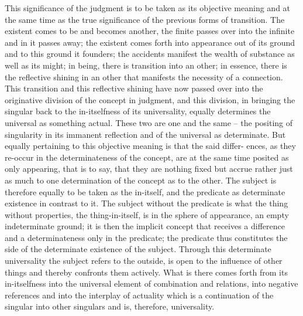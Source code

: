 This significance of the judgment is to be taken as its objective meaning
and at the same time as the true significance of the previous forms of
transition. The existent comes to be and becomes another, the finite passes
over into the infinite and in it passes away; the existent comes forth into
appearance out of its ground and to this ground it founders; the accidents
manifest the wealth of substance as well as its might; in being, there is
transition into an other; in essence, there is the reflective shining in an
other that manifests the necessity of a connection. This transition and this
reflective shining have now passed over into the originative division of the
concept in judgment, and this division, in bringing the singular back to the
in-itselfness of its universality, equally determines the universal as something
actual. These two are one and the same – the positing of singularity in its
immanent reflection and of the universal as determinate.
But equally pertaining to this objective meaning is that the said differ-
ences, as they re-occur in the determinateness of the concept, are at the
same time posited as only appearing, that is to say, that they are nothing
fixed but accrue rather just as much to one determination of the concept as
to the other. The subject is therefore equally to be taken as the in-itself, and
the predicate as determinate existence in contrast to it. The subject without
the predicate is what the thing without properties, the thing-in-itself, is in
the sphere of appearance, an empty indeterminate ground; it is then the
implicit concept that receives a difference and a determinateness only in
the predicate; the predicate thus constitutes the side of the determinate
existence of the subject. Through this determinate universality the subject
refers to the outside, is open to the influence of other things and thereby
confronts them actively. What is there comes forth from its in-itselfness into
the universal element of combination and relations, into negative references
and into the interplay of actuality which is a continuation of the singular
into other singulars and is, therefore, universality.

